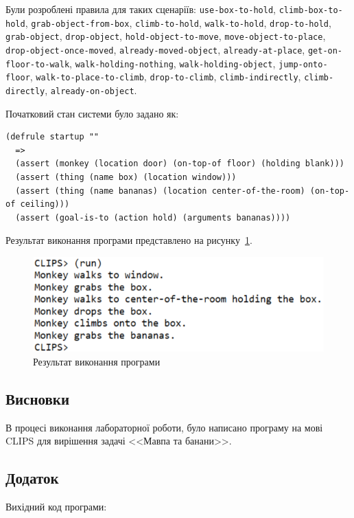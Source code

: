 Були розроблені правила для таких сценаріїв:
\texttt{use-box-to-hold},
\texttt{climb-box-to-hold},
\texttt{grab-object-from-box},
\texttt{climb-to-hold},
\texttt{walk-to-hold},
\texttt{drop-to-hold},
\texttt{grab-object},
\texttt{drop-object},
\texttt{hold-object-to-move},
\texttt{move-object-to-place},
\texttt{drop-object-once-moved},
\texttt{already-moved-object},
\texttt{already-at-place},
\texttt{get-on-floor-to-walk},
\texttt{walk-holding-nothing},
\texttt{walk-holding-object},
\texttt{jump-onto-floor},
\texttt{walk-to-place-to-climb},
\texttt{drop-to-climb},
\texttt{climb-indirectly},
\texttt{climb-directly},
\texttt{already-on-object}.

Початковий стан системи було задано як:
\begin{lstlisting}
(defrule startup ""
  =>
  (assert (monkey (location door) (on-top-of floor) (holding blank)))
  (assert (thing (name box) (location window)))
  (assert (thing (name bananas) (location center-of-the-room) (on-top-of ceiling)))
  (assert (goal-is-to (action hold) (arguments bananas))))
\end{lstlisting}

Результат виконання програми представлено на рисунку~\ref{fig:result}.

\begin{figure}[H]
	\centering
	    \includegraphics{result}
	\caption{Результат виконання програми}
	\label{fig:result}
\end{figure}

\subsection*{Висновки}
В процесі виконання лабораторної роботи, було написано програму на мові CLIPS для вирішення задачі <<Мавпа та банани>>.

\subsection*{Додаток}
Вихідний код програми:
 


